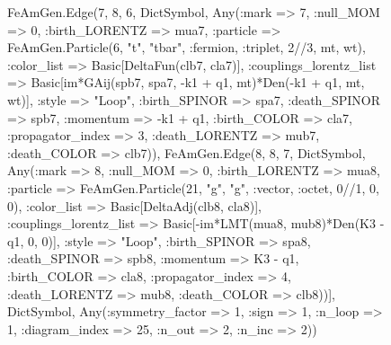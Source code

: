 \documentclass{revtex4}
\begin{document}
\begin{figure}[!htb]
\begin{center}
{FeAmGen.Edge(7, 8, 6, Dict{Symbol, Any}(:mark => 7, :null_MOM => 0, :birth_LORENTZ => mua7, :particle => FeAmGen.Particle(6, "t", "tbar", :fermion, :triplet, 2//3, mt, wt), :color_list => Basic[DeltaFun(clb7, cla7)], :couplings_lorentz_list => Basic[im*GAij(spb7, spa7, -k1 + q1, mt)*Den(-k1 + q1, mt, wt)], :style => "Loop", :birth_SPINOR => spa7, :death_SPINOR => spb7, :momentum => -k1 + q1, :birth_COLOR => cla7, :propagator_index => 3, :death_LORENTZ => mub7, :death_COLOR => clb7)), FeAmGen.Edge(8, 8, 7, Dict{Symbol, Any}(:mark => 8, :null_MOM => 0, :birth_LORENTZ => mua8, :particle => FeAmGen.Particle(21, "g", "g", :vector, :octet, 0//1, 0, 0), :color_list => Basic[DeltaAdj(clb8, cla8)], :couplings_lorentz_list => Basic[-im*LMT(mua8, mub8)*Den(K3 - q1, 0, 0)], :style => "Loop", :birth_SPINOR => spa8, :death_SPINOR => spb8, :momentum => K3 - q1, :birth_COLOR => cla8, :propagator_index => 4, :death_LORENTZ => mub8, :death_COLOR => clb8))], Dict{Symbol, Any}(:symmetry_factor => 1, :sign => 1, :n_loop => 1, :diagram_index => 25, :n_out => 2, :n_inc => 2)) 
}
\end{center}
\end{figure}
\end{document}
